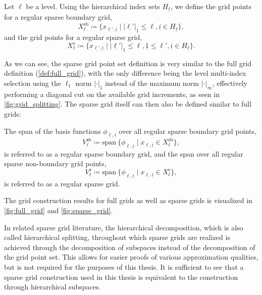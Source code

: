 \documentclass[
  a4paper,  %
  twoside,  %
  bibliography=totoc,
  headsepline,
  cleardoublepage=empty,
  parskip=half,
  draft=false
]{scrbook}
\begin{document}
\begin{definition}
Let $\ell$ be a level. Using the hierarchical index sets $H_{\underline{\ell}}$, we define the grid points for a regular sparse boundary grid,
\begin{equation}
X^{\mathrm{sb}}_{\ell} \coloneqq \{x_{\underline{\ell'},\underline{i}} \mid |\underline{\ell'}|_1 \leq \ell, \underline{i} \in H_{\underline{\ell}}\},
\end{equation}
and the grid points for a regular sparse grid,
\begin{equation}
X^{\mathrm{s}}_{\ell} \coloneqq \{x_{\underline{\ell'},\underline{i}} \mid |\underline{\ell'}|_1 \leq \ell, \underline{1} \leq \ell', \underline{i} \in H_{\underline{\ell}}\}.
\end{equation}
\end{definition}
%
As we can see, the sparse grid point set definition is very similar to the full grid definition (\cref{def:full_grid}), with the only difference being the level multi-index selection using the $\ell_1$ norm $|\cdot|_1$ instead of the maximum norm $|\cdot|_\infty$, effectively performing a diagonal cut on the available grid increments, as seen in \cref{fig:grid_splitting}.
The sparse grid itself can then also be defined similar to full grids:
\begin{definition}
The span of the basis functions $\phi_{\underline{\ell},\underline{i}}$ over all regular sparse boundary grid points,
\begin{equation}
V^{\mathrm{sb}}_{\ell} \coloneqq \mathrm{span}~ \{\phi_{\underline{\ell},\underline{i}} \mid x_{\underline{\ell},\underline{i}} \in X^{\mathrm{sb}}_{\ell}\},
\end{equation}
is referred to as a regular sparse boundary grid, and the span over all regular sparse non-boundary grid points,
\begin{equation}
V^{\mathrm{s}}_{\ell} \coloneqq \mathrm{span}~ \{\phi_{\underline{\ell},\underline{i}} \mid x_{\underline{\ell},\underline{i}} \in X^{\mathrm{s}}_{\ell}\},
\label{eq:sparse_grid}
\end{equation}
is referred to as a regular sparse grid.
\label{def:sparse_grid}
\end{definition}
%
The grid construction results for full grids as well as sparse grids is visualized in \cref{fig:full_grid} and \cref{fig:sparse_grid}.

In related sparse grid literature, the hierarchical decomposition, which is also called hierarchical splitting, throughout which sparse grids are realized is achieved through the decomposition of subspaces instead of the decomposition of the grid point set.
This allows for easier proofs of various approximation qualities, but is not required for the purposes of this thesis.
It is sufficient to see that a sparse grid construction used in this thesis is equivalent to the construction through hierarchical subspaces.
\end{document}
